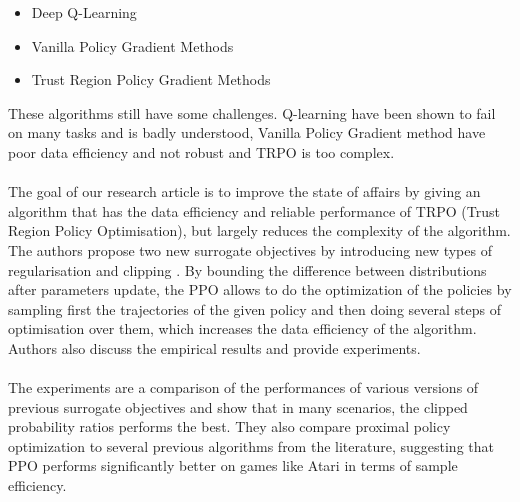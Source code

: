 \documentclass{article}
\begin{document}
\begin{itemize}
    \item Deep Q-Learning
    \item Vanilla Policy Gradient Methods
    \item Trust Region Policy Gradient Methods
\end{itemize}
These algorithms still have some challenges. Q-learning have been shown to fail on many tasks and is badly understood, Vanilla Policy Gradient method have poor data efficiency and not robust and TRPO is too complex. \\ \\
The goal of our research article is to improve the state of affairs by giving an algorithm that has the data efficiency and reliable performance of TRPO \cite{schulman2017trust} (Trust Region Policy Optimisation), but largely reduces the complexity of the algorithm. The authors propose two new surrogate objectives by introducing new types of regularisation and clipping . By bounding the difference between distributions after parameters update, the PPO allows to do the optimization of the policies by sampling first the trajectories of the given policy and then doing several steps of optimisation over them, which increases the data efficiency of the algorithm. 
Authors also discuss the empirical results and provide experiments. \\ \\
The experiments are a comparison of the performances of various versions of previous surrogate objectives and show that in many scenarios, the clipped probability ratios performs the best. They also compare proximal policy optimization to several previous algorithms from the literature, suggesting that PPO performs significantly better on games like Atari in terms of sample efficiency.

\end{document}
